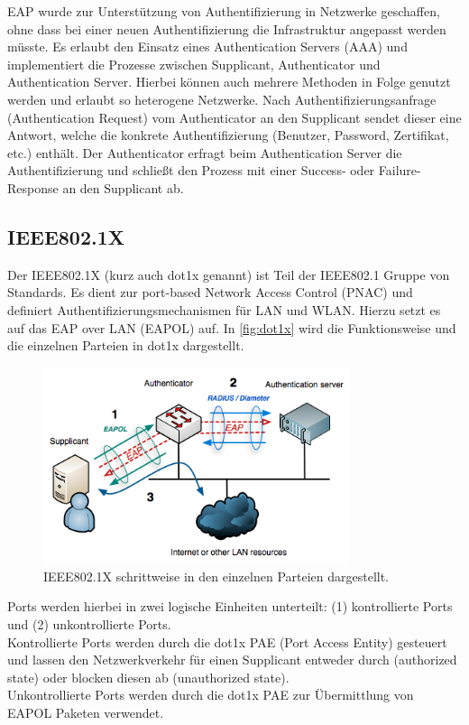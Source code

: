 \documentclass[conference]{IEEEtran}
\begin{document}
EAP wurde zur Unterstützung von Authentifizierung in Netzwerke geschaffen, ohne dass  bei einer neuen Authentifizierung die Infrastruktur angepasst werden müsste. Es erlaubt den Einsatz eines Authentication Servers (AAA) und implementiert die Prozesse zwischen Supplicant, Authenticator und Authentication Server. Hierbei können auch mehrere Methoden in Folge genutzt werden und erlaubt so heterogene Netzwerke. Nach Authentifizierungsanfrage (Authentication Request) vom Authenticator an den Supplicant sendet dieser eine Antwort, welche die konkrete Authentifizierung (Benutzer, Password, Zertifikat, etc.) enthält. Der Authenticator erfragt beim Authentication Server die Authentifizierung und schließt den Prozess mit einer Success- oder Failure-Response an den Supplicant ab.

\subsection{IEEE802.1X}
Der IEEE802.1X (kurz auch dot1x genannt) ist Teil der IEEE802.1 Gruppe von Standards. Es dient zur port-based Network Access Control (PNAC) und definiert Authentifizierungsmechanismen für LAN und WLAN. Hierzu setzt es auf das EAP over LAN (EAPOL) auf. In \autoref{fig:dot1x} wird die Funktionsweise und die einzelnen Parteien in dot1x dargestellt.\\

\begin{figure}[hbt]
	\centering
	\includegraphics[width=9cm]{figures/dot1x}
	\caption{IEEE802.1X schrittweise in den einzelnen Parteien dargestellt.}
	\label{fig:dot1x}
\end{figure}

Ports werden hierbei in zwei logische Einheiten unterteilt: (1) kontrollierte Ports und (2) unkontrollierte Ports.\\
Kontrollierte Ports werden durch die dot1x PAE (Port Access Entity) gesteuert und lassen den Netzwerkverkehr für einen Supplicant entweder durch (authorized state) oder blocken diesen ab (unauthorized state).\\
Unkontrollierte Ports werden durch die dot1x PAE zur Übermittlung von EAPOL Paketen verwendet.
\end{document}

